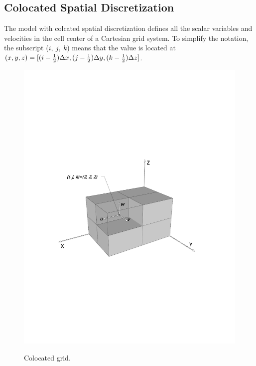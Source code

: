 \normalsize
\subsection{Colocated Spatial Discretization}
The model with colcated spatial discretization defines all the scalar variables and velocities in the cell center of a Cartesian grid system. To simplify the notation, the subscript ($i, \ j, \ k$) means that the value is located at $(x,y,z)=[  (i-\frac{1}{2}) \Delta x, (j-\frac{1}{2}) \Delta y, (k-\frac{1}{2})\Delta z ]$.
\begin{figure}[h]
\hspace{0.4in}
\includegraphics[width=4.7in]{../figures/Colocated/Colocated3D.pdf}
\label{fig:Colocated3D}
\caption{Colocated grid.}
\end{figure}
